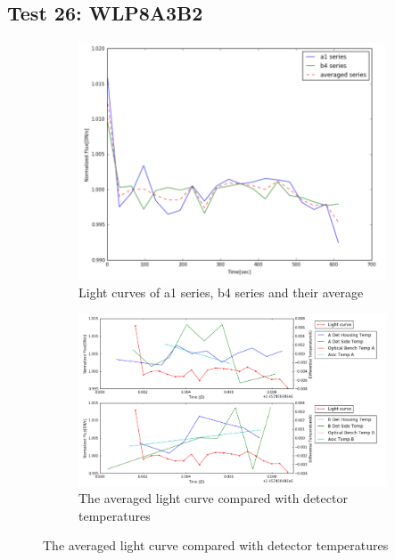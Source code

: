 \documentclass{aastex6}
\begin{document}
\subsection{Test 26: WLP8A3B2} 
\begin{figure}[H]
    \centering
    \begin{subfigure}{1}
        \includegraphics[scale=0.4]{ts_test26}
        \caption{Light curves of a1 series, b4 series and their average}
    \end{subfigure}

    \begin{subfigure}{2}
        \includegraphics[scale=0.4]{temp_test26}
        \caption{The averaged light curve compared with detector temperatures}
    \end{subfigure}
   

\end{figure}
\end{document}
